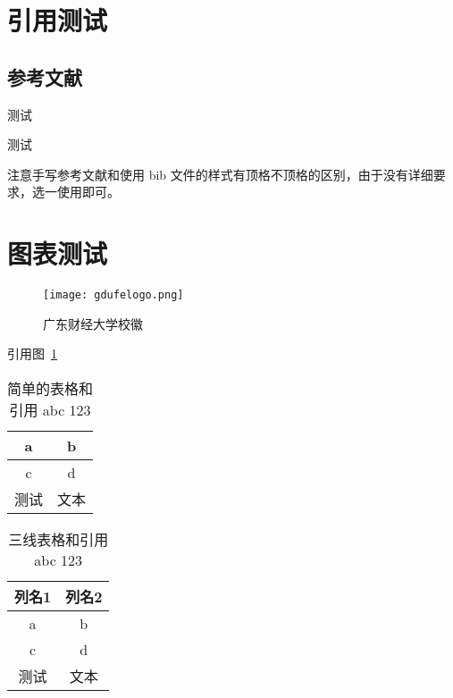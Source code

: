 \documentclass[class = professional, oneside]{gdufe_master_thesis}
\begin{document}
\section{引用测试}

\subsection{参考文献}

测试 \cite{anon-cn1,anon-cn2,anon-cn3,anon-cn4,anon-cn5}

测试 \cite*{anon-en1,anon-en2,anon-en3,anon-en4,anon-en5}

注意手写参考文献和使用 bib 文件的样式有顶格不顶格的区别，由于没有详细要求，选一使用即可。

\section{图表测试}

\begin{figure}[ht]
    \centering
    \texttt{[image: gdufelogo.png]}
    \caption{广东财经大学校徽}
    \label{fig:广东财经大学校徽}
\end{figure}

引用图~\ref{fig:广东财经大学校徽}

\begin{table}[ht]
    \centering
    \caption{%
        简单的表格和引用 abc 123 %
    }
    \label{table:简单的表格}
    \begin{tabular}{cc}
        \hline
        a  & b  \\ \hline
        c  & d  \\ \hline
        测试 & 文本 \\ \hline
    \end{tabular}
\end{table}

\begin{table}[ht]
    \centering
    \caption{%
        三线表格和引用 abc 123 %
    }
    \label{table:三线表格}
    \begin{tabular}{cc}
        \toprule
        列名1 & 列名2 \\ \midrule
        a   & b   \\
        c   & d   \\
        测试  & 文本  \\ \bottomrule
    \end{tabular}
\end{table}
\end{document}
